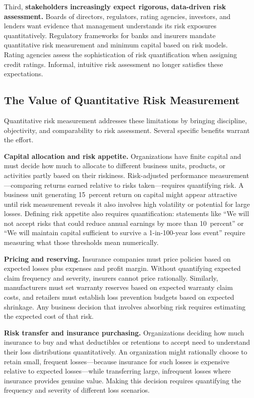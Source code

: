 \documentclass[11pt,openany]{book}
\begin{document}
Third, \textbf{stakeholders increasingly expect rigorous, data-driven risk
assessment.} Boards of directors, regulators, rating agencies, investors, and
lenders want evidence that management understands its risk exposures
quantitatively. Regulatory frameworks for banks and insurers mandate
quantitative risk measurement and minimum capital based on risk models. Rating
agencies assess the sophistication of risk quantification when assigning credit
ratings. Informal, intuitive risk assessment no longer satisfies these
expectations.

\subsection{The Value of Quantitative Risk Measurement}
\label{subsec:quantitative-value}

Quantitative risk measurement addresses these limitations by bringing
discipline, objectivity, and comparability to risk assessment. Several specific
benefits warrant the effort.

\textbf{Capital allocation and risk appetite.} Organizations have finite capital
and must decide how much to allocate to different business units, products, or
activities partly based on their riskiness. Risk-adjusted performance
measurement---comparing returns earned relative to risks taken---requires
quantifying risk. A business unit generating 15~percent return on capital might
appear attractive until risk measurement reveals it also involves high
volatility or potential for large losses. Defining risk appetite also requires
quantification: statements like ``We will not accept risks that could reduce
annual earnings by more than 10~percent'' or ``We will maintain capital
sufficient to survive a 1-in-100-year loss event'' require measuring what those
thresholds mean numerically.

\textbf{Pricing and reserving.} Insurance companies must price policies based on
expected losses plus expenses and profit margin. Without quantifying expected
claim frequency and severity, insurers cannot price rationally. Similarly,
manufacturers must set warranty reserves based on expected warranty claim costs,
and retailers must establish loss prevention budgets based on expected
shrinkage. Any business decision that involves absorbing risk requires
estimating the expected cost of that risk.

\textbf{Risk transfer and insurance purchasing.} Organizations deciding how much
insurance to buy and what deductibles or retentions to accept need to understand
their loss distributions quantitatively. An organization might rationally choose
to retain small, frequent losses---because insurance for such losses is
expensive relative to expected losses---while transferring large, infrequent
losses where insurance provides genuine value. Making this decision requires
quantifying the frequency and severity of different loss scenarios.
\end{document}
